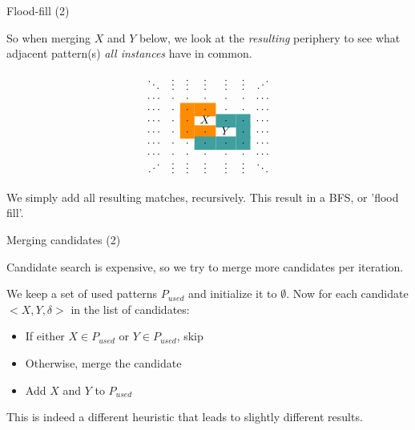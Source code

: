 \documentclass[11pt]{beamer}
\begin{document}
\begin{frame}{Flood-fill (2)}

So when merging $X$ and $Y$ below, we look at the \emph{resulting} periphery to see what adjacent pattern(s) \emph{all instances} have in common.

\newcommand{\Ant}{\cellcolor{red!45!yellow}\cdot}
\newcommand{\Post}{\cellcolor{teal!75}\cdot}

$$
\begin{matrix}
\ddots & \vdots & \vdots & \vdots & \vdots & \vdots & \iddots \\[-.2em]
\cdots & \cdot & \cdot & \cdot & \cdot & \cdot & \cdots \\[-.2em]
\cdots & \cdot & \Ant  & \Ant  & \cdot & \cdot  & \cdots \\[-.2em]
\cdots & \cdot & \Ant  & X     & \Post & \Post & \cdots \\[-.2em]
\cdots & \cdot & \Ant  & \Ant  & Y      & \Post & \cdots \\[-.2em]
\cdots & \cdot & \cdot & \Post & \Post & \Post & \cdots \\[-.2em]
\cdots & \cdot & \cdot & \cdot & \cdot & \cdot & \cdots \\[-.4em]
\iddots & \vdots & \vdots & \vdots & \vdots & \vdots & \ddots
\end{matrix}
$$

We simply add all resulting matches, recursively. This result in a BFS, or 'flood fill'.

\end{frame}


\begin{frame}{Merging candidates (2)}

Candidate search is expensive, so we try to merge more candidates per iteration.\medskip

We keep a set of used patterns $P_{used}$ and initialize it to $\emptyset$. Now for each candidate $<X,Y,\delta>$ in the list of candidates:
\begin{itemize}
\item If either $X\in P_{used}$ or $Y \in P_{used}$, skip
\item Otherwise, merge the candidate
\item Add $X$ and $Y$ to $P_{used}$
\end{itemize}

This is indeed a different heuristic that leads to slightly different results.

\end{frame}
\end{document}
